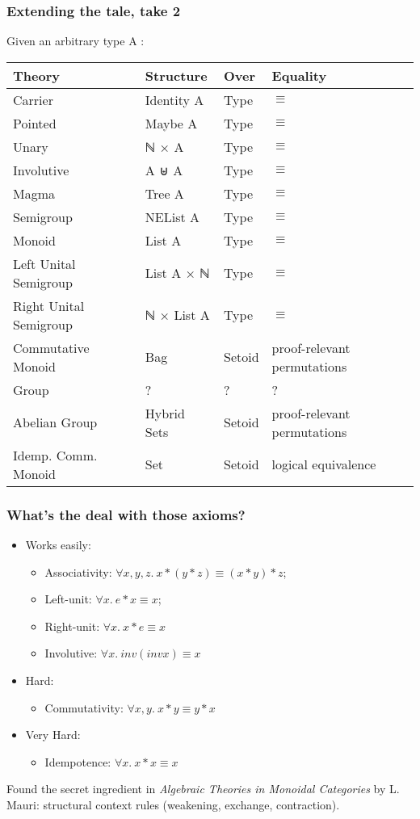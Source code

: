 \documentclass[serif,mathserif,professionalfont,10pt]{beamer}
\begin{document}
\begin{frame}
\frametitle{Extending the tale, take 2}
Given an arbitrary type A : \\ \vspace*{4mm}
\begin{tabular}{llll}
\textbf{Theory} & \textbf{Structure} & Over & Equality \\ \hline
Carrier & Identity A & Type  & $\equiv$ \\
Pointed & Maybe A & Type & $\equiv$\\ \hline
Unary & ℕ × A &  Type & $\equiv$\\
Involutive & A ⊎ A & Type & $\equiv$ \\ \hline
Magma & Tree A &  Type & $\equiv$\\
Semigroup & NEList A & Type & $\equiv$\\ \hline
Monoid & List A & Type & $\equiv$\\
Left Unital Semigroup & List A × ℕ & Type & $\equiv$\\
Right Unital Semigroup & ℕ × List A & Type & $\equiv$\\ \hline
Commutative Monoid & Bag & Setoid &  proof-relevant permutations \\
Group & ? & ? & ? \\
Abelian Group & Hybrid Sets & Setoid &  proof-relevant permutations\\
Idemp. Comm. Monoid & Set & Setoid &  logical equivalence \\
\end{tabular}
\end{frame}

\begin{frame}
\frametitle{What's the deal with those axioms?}
\begin{itemize}
\item Works easily:
\begin{itemize}
\item Associativity: $\forall x, y, z.\ x * (y * z) \equiv (x * y) *z$;
\item Left-unit: $\forall x.\ e * x \equiv x$;
\item Right-unit: $\forall x.\ x * e \equiv x$
\item Involutive: $\forall x.\ inv (inv x) \equiv x$
\end{itemize}
\item Hard:
\begin{itemize}
\item Commutativity: $\forall x, y.\ x * y \equiv y * x$
\end{itemize}
\item Very Hard:
\begin{itemize}
\item Idempotence: $\forall x.\ x * x \equiv x$
\end{itemize}
\end{itemize}
\pause
Found the secret ingredient in \textit{Algebraic Theories in Monoidal
  Categories} by L. Mauri: structural context rules (weakening,
exchange, contraction).
\end{frame}
\end{document}
